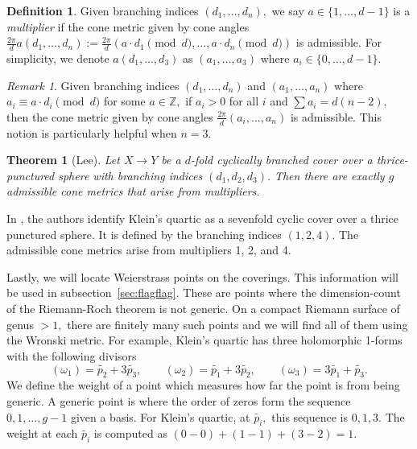 \documentclass[12pt,reqno]{amsart}
\newtheorem*{thm*}{Theorem}
\theoremstyle{definition}
\newtheorem{defn}{Definition}
\theoremstyle{remark}
\newtheorem*{remark}{Remark}
\begin{document}
\begin{defn} Given branching indices $(d_1, \ldots , d_n),$ we say $a \in \{1, \ldots, d - 1\}$ is a \textit{multiplier} if the cone metric given by cone angles $\frac{2 \pi}{d} a (d_1, \ldots , d_n) := \frac{2 \pi}{d} (a \cdot d_1 \pmod d, \ldots , a \cdot d_n \pmod d)$ is admissible. For simplicity, we denote $a (d_1,\ldots , d_3)$ as $(a_1, \ldots , a_3)$ where $a_i \in \{0, \ldots , d - 1\}.$ 
\end{defn}

\begin{remark} Given branching indices $(d_1, \ldots , d_n)$ and $(a_1, \ldots , a_n)$ where $a_i \equiv a \cdot d_i \pmod d$ for some $a \in \mathbb{Z},$ if $a_i > 0$ for all $i$ and $\sum a_i = d (n - 2),$ then the cone metric given by cone angles $\frac{2 \pi}{d} (a_i, \ldots , a_n)$ is admissible. This notion is particularly helpful when $n = 3.$\end{remark}

\begin{thm*} [Lee]
Let $X \rightarrow Y$ be a $d$-fold cyclically branched cover over a thrice-punctured sphere with branching indices $(d_1, d_2, d_3).$ Then there are exactly $g$ admissible cone metrics that arise from multipliers. 
\end{thm*}

In \cite{kw}, the authors identify Klein's quartic as a sevenfold cyclic cover over a thrice punctured sphere. It is defined by the branching indices $(1, 2, 4).$ The admissible cone metrics arise from multipliers 1, 2, and 4. 

Lastly, we will locate Weierstrass points on the coverings. This information will be used in subsection~\ref{sec:flagflag}. These are points where the dimension-count of the Riemann-Roch theorem is not generic. On a compact Riemann surface of genus $> 1,$ there are finitely many such points and we will find all of them using the Wronski metric. For example, Klein's quartic has three holomorphic 1-forms with the following divisors $$(\omega_1) = \widetilde{p_2} + 3 \widetilde{p_3}, \qquad (\omega_2) = \widetilde{p_1} + 3 \widetilde{p_2}, \qquad (\omega_3) = 3 \widetilde{p_1} + \widetilde{p_3}.$$ We define the weight of a point which measures how far the point is from being generic. A generic point is where the order of zeros form the sequence $0, 1, \ldots , g - 1$ given a basis. For Klein's quartic, at $\widetilde{p_i},$ this sequence is $0, 1, 3.$ The weight at each $\widetilde{p_i}$ is computed as $(0 - 0) + (1 - 1) + (3 - 2) = 1.$ 
\end{document}
